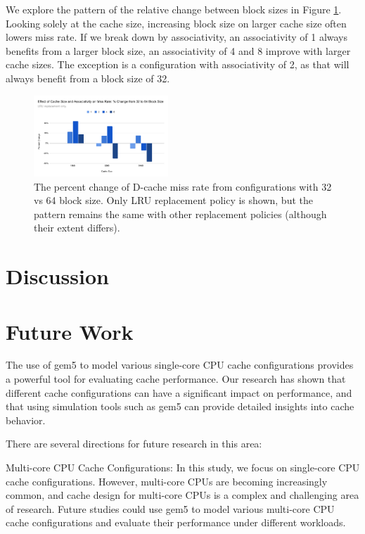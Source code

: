 \documentclass[conference]{IEEEtran}
\begin{document}
We explore the pattern of the relative change between block sizes in Figure \ref{fig:rijndael-missrate-percentchange}. Looking solely at the cache size, increasing block size on larger cache size often lowers miss rate. If we break down by associativity, an associativity of 1 always benefits from a larger block size, an associativity of 4 and 8 improve with larger cache sizes. The exception is a configuration with associativity of 2, as that will always benefit from a block size of 32.

\begin{figure}[H]
  \centering
  \includegraphics[width=0.45\textwidth]{images/rijndael_missrate_percentchange}
  \caption{The percent change of D-cache miss rate from configurations with 32 vs 64 block size. Only LRU replacement policy is shown, but the pattern remains the same with other replacement policies (although their extent differs).}
  \label{fig:rijndael-missrate-percentchange}
\end{figure}

\section{Discussion}


\section{Future Work}
The use of gem5 to model various single-core CPU cache configurations provides a powerful tool for evaluating cache performance. Our research has shown that different cache configurations can have a significant impact on performance, and that using simulation tools such as gem5 can provide detailed insights into cache behavior.

There are several directions for future research in this area:

Multi-core CPU Cache Configurations: In this study, we focus on single-core CPU cache configurations. However, multi-core CPUs are becoming increasingly common, and cache design for multi-core CPUs is a complex and challenging area of research. Future studies could use gem5 to model various multi-core CPU cache configurations and evaluate their performance under different workloads.
\end{document}
